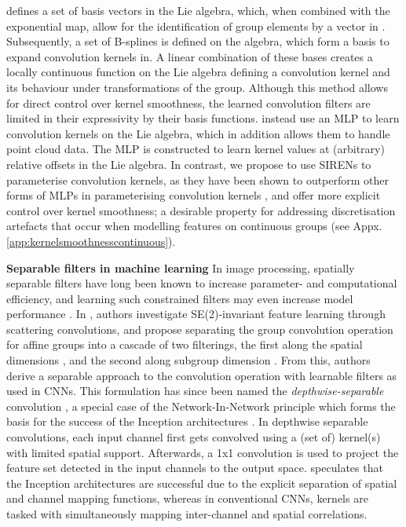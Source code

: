 \documentclass[nohyperref]{article}
\theoremstyle{plain}
\theoremstyle{definition}
\theoremstyle{remark}
\begin{document}
\citet{bekkers2019b} defines a set of basis vectors in the Lie algebra, which, when combined with the exponential map, allow for the identification of group elements by a vector in . Subsequently, a set of B-splines is defined on the algebra, which form a basis to expand convolution kernels in. A linear combination of these bases creates a locally continuous function on the Lie algebra defining a convolution kernel and its behaviour under transformations of the group. Although this method allows for direct control over kernel smoothness, the learned convolution filters are limited in their expressivity by their basis functions. \citet{finzi2020generalizing} instead use an MLP to learn convolution kernels on the Lie algebra, which in addition allows them to handle point cloud data. The MLP is constructed to learn kernel values at (arbitrary) relative offsets in the Lie algebra. In contrast, we propose to use SIRENs \citep{sitzmann2020implicit} to parameterise convolution kernels, as they have been shown to outperform other forms of MLPs in parameterising convolution kernels \citep{romero2021ckconv}, and offer more explicit control over kernel smoothness; a desirable property for addressing \break discretisation artefacts that occur when modelling features on continuous groups (see Appx. \ref{app:kernelsmoothnesscontinuous}).

\textbf{Separable filters in machine learning}
In image processing, spatially separable filters have long been known to increase parameter- and computational efficiency, and learning such constrained filters may even increase model performance \citep{rigamonti2013learning}. In \citet{sifre2014rigid}, authors investigate SE(2)-invariant feature learning through scattering convolutions, and propose separating the group convolution operation for affine groups into a cascade of two filterings, the first along the spatial dimensions , and the second along subgroup dimension . From this, authors derive a separable approach to the convolution operation with learnable filters as used in CNNs. This formulation has since been named the \textit{depthwise-separable} convolution \citep{chollet2017xception}, a special case of the Network-In-Network principle \citep{lin2013network} which forms the basis for the success of the Inception architectures \citep{szegedy2015going}. In depthwise separable convolutions, each input channel first gets convolved using a (set of) kernel(s) with limited spatial support. Afterwards, a 1x1 convolution is used to project the feature set detected in the input channels to the output space. \citet{chollet2017xception} speculates that the Inception architectures are successful due to the explicit separation of spatial and channel mapping functions, whereas in conventional CNNs, kernels are tasked with simultaneously mapping inter-channel and spatial correlations.
\end{document}
